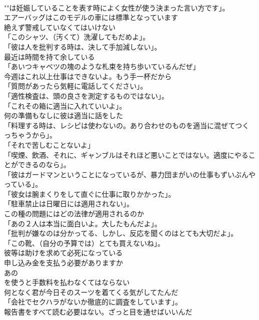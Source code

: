\documentclass[8pt]{extreport}
\begin{document}
\begin{CJK}{UTF8}{min}
\\	""は妊娠していることを表す時によく女性が使う決まった言い方です」。
\\	エアーバッグはこのモデルの車には標準となっています	
\\	絶えず警戒していなくてはいけない	
\\	「このシャツ、（汚くて）洗濯してもだめよ」。	
\\	「彼は人を批判する時は、決して手加減しない」。	
\\	最近は時間を持て余している	
\\	「あいつキャベツの塊のような札束を持ち歩いているんだぜ」	
\\	今週はこれ以上仕事はできないよ。もう手一杯だから	
\\	「質問があったら気軽に電話してください」。	
\\	「適性検査は、頭の良さを測定するものではない」。	
\\	「これその箱に適当に入れていいよ」。	
\\	何の準備もなしに彼は適当に話をした	
\\	「料理する時は、レシピは使わないの。あり合わせのものを適当に混ぜてつくっちゃうから」。	
\\	「それで苦しむことないよ」	
\\	「喫煙、飲酒、それに、ギャンブルはそれほど悪いことではない。適度にやることができるのなら」。	
\\	「彼はガードマンということになっているが、暴力団まがいの仕事もずいぶんやっている」。	
\\	「彼女は腕まくりをして直ぐに仕事に取りかかった」。	
\\	「駐車禁止は日曜日には適用されない」。	
\\	この種の問題にはどの法律が適用されるのか	
\\	「あの２人は本当に面白いよ。大したもんだよ」。	
\\	「批判が嫌なのは分かってる、しかし、反応を聞くのはとても大切だよ」。	
\\	「この靴、（自分の予算では）とても買えないね」。	
\\	彼等は助けを求めて必死になっている	
\\	申し込み金を支払う必要がありますか	
\\	あの
\\	を使うと手数料を払わなくてはならない	
\\	何となく君が今日そのスーツを着てくる気がしてたんだ	
\\	「会社でセクハラがないか徹底的に調査をしています」。	
\\	報告書をすべて読む必要はない。ざっと目を通せばいいんだ	

\end{CJK}
\end{document}
